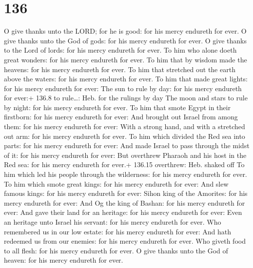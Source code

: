 \hypertarget{section-136}{%
\section{136}\label{section-136}}

 O give thanks unto the LORD; for he is good: for his mercy
endureth for ever.  O give thanks unto the God of gods: for
his mercy endureth for ever.  O give thanks to the Lord of
lords: for his mercy endureth for ever.  To him who alone
doeth great wonders: for his mercy endureth for ever.  To
him that by wisdom made the heavens: for his mercy endureth for ever.
 To him that stretched out the earth above the waters: for
his mercy endureth for ever.  To him that made great lights:
for his mercy endureth for ever:  The sun to rule by day:
for his mercy endureth for ever:+ 136.8 to rule\ldots: Heb. for the
rulings by day  The moon and stars to rule by night: for his
mercy endureth for ever.  To him that smote Egypt in their
firstborn: for his mercy endureth for ever:  And brought
out Israel from among them: for his mercy endureth for ever:
 With a strong hand, and with a stretched out arm: for his
mercy endureth for ever.  To him which divided the Red sea
into parts: for his mercy endureth for ever:  And made
Israel to pass through the midst of it: for his mercy endureth for ever:
 But overthrew Pharaoh and his host in the Red sea: for his
mercy endureth for ever.+ 136.15 overthrew: Heb. shaked off
 To him which led his people through the wilderness: for
his mercy endureth for ever.  To him which smote great
kings: for his mercy endureth for ever:  And slew famous
kings: for his mercy endureth for ever:  Sihon king of the
Amorites: for his mercy endureth for ever:  And Og the king
of Bashan: for his mercy endureth for ever:  And gave their
land for an heritage: for his mercy endureth for ever: 
Even an heritage unto Israel his servant: for his mercy endureth for
ever.  Who remembered us in our low estate: for his mercy
endureth for ever:  And hath redeemed us from our enemies:
for his mercy endureth for ever.  Who giveth food to all
flesh: for his mercy endureth for ever.  O give thanks unto
the God of heaven: for his mercy endureth for ever.


